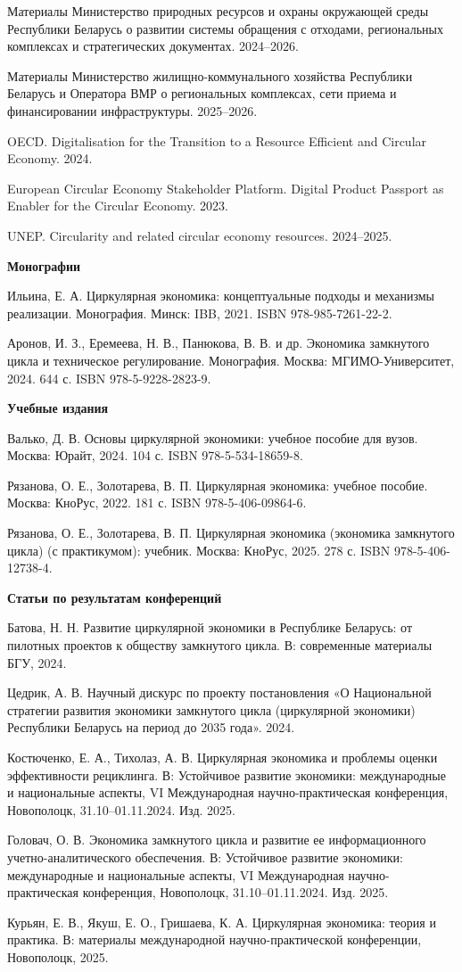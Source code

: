 \documentclass[14pt,a4paper]{extarticle}
\begin{document}
Материалы Министерство природных ресурсов и охраны окружающей среды Республики Беларусь о развитии системы обращения с отходами, региональных комплексах и стратегических документах. 2024--2026.

Материалы Министерство жилищно-коммунального хозяйства Республики Беларусь и Оператора ВМР о региональных комплексах, сети приема и финансировании инфраструктуры. 2025--2026.

OECD. Digitalisation for the Transition to a Resource Efficient and Circular Economy. 2024.

European Circular Economy Stakeholder Platform. Digital Product Passport as Enabler for the Circular Economy. 2023.

UNEP. Circularity and related circular economy resources. 2024--2025.

\textbf{Монографии}

Ильина, Е. А. Циркулярная экономика: концептуальные подходы и механизмы реализации. Монография. Минск: IBB, 2021. ISBN 978-985-7261-22-2.

Аронов, И. З., Еремеева, Н. В., Панюкова, В. В. и др. Экономика замкнутого цикла и техническое регулирование. Монография. Москва: МГИМО-Университет, 2024. 644 с. ISBN 978-5-9228-2823-9.

\textbf{Учебные издания}

Валько, Д. В. Основы циркулярной экономики: учебное пособие для вузов. Москва: Юрайт, 2024. 104 с. ISBN 978-5-534-18659-8.

Рязанова, О. Е., Золотарева, В. П. Циркулярная экономика: учебное пособие. Москва: КноРус, 2022. 181 с. ISBN 978-5-406-09864-6.

Рязанова, О. Е., Золотарева, В. П. Циркулярная экономика (экономика замкнутого цикла) (с практикумом): учебник. Москва: КноРус, 2025. 278 с. ISBN 978-5-406-12738-4.

\textbf{Статьи по результатам конференций}

Батова, Н. Н. Развитие циркулярной экономики в Республике Беларусь: от пилотных проектов к обществу замкнутого цикла. В: современные материалы БГУ, 2024.

Цедрик, А. В. Научный дискурс по проекту постановления «О Национальной стратегии развития экономики замкнутого цикла (циркулярной экономики) Республики Беларусь на период до 2035 года». 2024.

Костюченко, Е. А., Тихолаз, А. В. Циркулярная экономика и проблемы оценки эффективности рециклинга. В: Устойчивое развитие экономики: международные и национальные аспекты, VI Международная научно-практическая конференция, Новополоцк, 31.10--01.11.2024. Изд. 2025.

Головач, О. В. Экономика замкнутого цикла и развитие ее информационного учетно-аналитического обеспечения. В: Устойчивое развитие экономики: международные и национальные аспекты, VI Международная научно-практическая конференция, Новополоцк, 31.10--01.11.2024. Изд. 2025.

Курьян, Е. В., Якуш, Е. О., Гришаева, К. А. Циркулярная экономика: теория и практика. В: материалы международной научно-практической конференции, Новополоцк, 2025.
\end{document}
